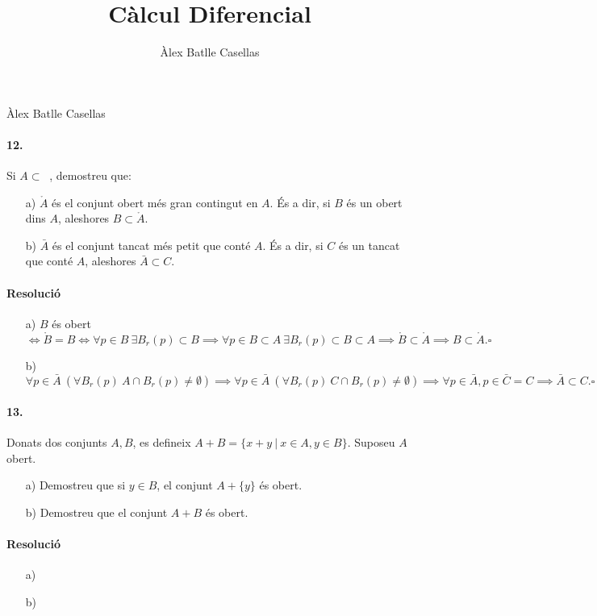 \documentclass[11pt]{article}
\title{Càlcul Diferencial}
\author{Àlex Batlle Casellas}
\DeclareMathOperator{\Rm}{\mathbb{R}^m}
\begin{document}
\begin{small}
Àlex Batlle Casellas
\end{small}
\paragraph{12.} Si $A\subset\Rm$, demostreu que:
\begin{itemize}
	\item[a)] $\mathring A$ és el conjunt obert més gran contingut en $A$. És a dir, si $B$ és un obert dins $A$, aleshores $B\subset\mathring A$.
	\item[b)] $\bar{A}$ és el conjunt tancat més petit que conté $A$. És a dir, si $C$ és un tancat que conté $A$, aleshores $
\bar{A}\subset C$.
\end{itemize}
\paragraph{Resolució}
\begin{itemize}
	\item[a)] $B$ és obert$\iff\mathring B=B\iff\forall p\in B\ \exists B_r(p)\subset B\implies\forall p\in B\subset A\ \exists B_r(p)\subset B\subset A\implies\mathring B\subset\mathring A\implies B\subset\mathring A.\square$
	\item[b)] $\forall p\in\bar{A}\ (\forall B_r(p)\ A\cap B_r(p)\neq\emptyset)\implies\forall p\in\bar{A}\ (\forall B_r(p)\ C\cap B_r(p)\neq\emptyset)\implies\forall p\in\bar{A},p\in\bar{C}=C\implies\bar{A}\subset C.\square$
\end{itemize}
\paragraph{13.} Donats dos conjunts $A,B$, es defineix $A+B=\{x+y\ \vert\ x\in A, y\in B\}$. Suposeu $A$ obert.
\begin{itemize}
	\item[a)] Demostreu que si $y\in B$, el conjunt $A+\{y\}$ és obert.
	\item[b)] Demostreu que el conjunt $A+B$ és obert.
\end{itemize}
\paragraph{Resolució}
\begin{itemize}
	\item[a)]
	\item[b)]
\end{itemize}
\end{document}
